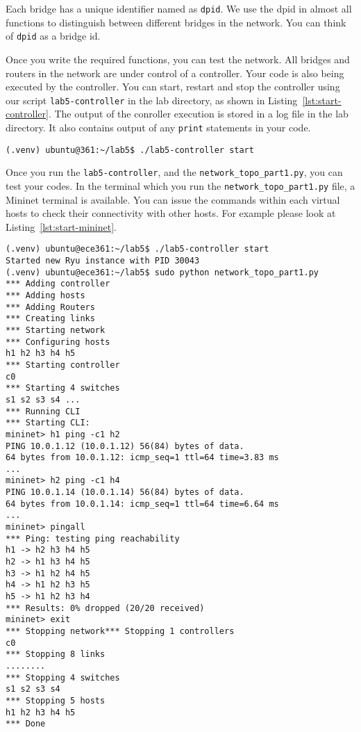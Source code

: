 \documentclass[11pt]{article}
\begin{document}
Each bridge has a unique identifier named as \texttt{dpid}. We use the dpid in almost all functions to distinguish between different bridges in the network. You can think of \texttt{dpid} as a bridge id.

Once you write the required functions, you can test the network. 
All bridges and routers in the network are under control of a controller. Your code is also being executed by the controller. You can start, restart and stop the controller using our script \texttt{lab5-controller} in the lab directory, as shown in Listing~\ref{lst:start-controller}. The output of the conroller execution is stored in a log file in the lab directory. It also contains output of any \texttt{print} statements in your code.


\begin{lstlisting}[style=ece361shell, caption={Create the network topology for first part}, label={lst:start-controller}]
(.venv) ubuntu@361:~/lab5$ ./lab5-controller start
\end{lstlisting}

Once you run the \texttt{lab5-controller}, and the \texttt{network\_topo\_part1.py}, you can test your codes. In the terminal which you run the \texttt{network\_topo\_part1.py} file, a Mininet terminal is available. You can issue the commands within each virtual hosts to check their connectivity with other hosts. For example please look at Listing~\ref{lst:start-mininet}.

\begin{lstlisting}[style=ece361shell, caption={Create the network topology for first part}, label={lst:start-mininet}]
(.venv) ubuntu@ece361:~/lab5$ ./lab5-controller start
Started new Ryu instance with PID 30043
(.venv) ubuntu@ece361:~/lab5$ sudo python network_topo_part1.py 
*** Adding controller
*** Adding hosts
*** Adding Routers
*** Creating links
*** Starting network
*** Configuring hosts
h1 h2 h3 h4 h5 
*** Starting controller
c0 
*** Starting 4 switches
s1 s2 s3 s4 ...
*** Running CLI
*** Starting CLI:
mininet> h1 ping -c1 h2
PING 10.0.1.12 (10.0.1.12) 56(84) bytes of data.
64 bytes from 10.0.1.12: icmp_seq=1 ttl=64 time=3.83 ms
...
mininet> h2 ping -c1 h4
PING 10.0.1.14 (10.0.1.14) 56(84) bytes of data.
64 bytes from 10.0.1.14: icmp_seq=1 ttl=64 time=6.64 ms
...
mininet> pingall
*** Ping: testing ping reachability
h1 -> h2 h3 h4 h5 
h2 -> h1 h3 h4 h5 
h3 -> h1 h2 h4 h5 
h4 -> h1 h2 h3 h5 
h5 -> h1 h2 h3 h4 
*** Results: 0% dropped (20/20 received)
mininet> exit
*** Stopping network*** Stopping 1 controllers
c0 
*** Stopping 8 links
........
*** Stopping 4 switches
s1 s2 s3 s4 
*** Stopping 5 hosts
h1 h2 h3 h4 h5 
*** Done
\end{lstlisting}
\end{document}
